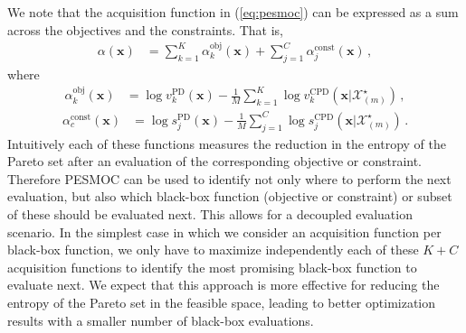 \documentclass[review,preprint,12pt]{elsarticle}
\begin{document}
We note that the acquisition function in (\ref{eq:pesmoc}) can be
expressed as a sum across the objectives and the constraints.
That is,
\begin{align}
\alpha(\mathbf{x}) &= \sum_{k=1}^K \alpha^\text{obj}_k(\mathbf{x}) + \sum_{j=1}^C \alpha^\text{const}_j(\mathbf{x})\,,
\end{align}
where
\begin{align}
\alpha^\text{obj}_k(\mathbf{x}) & 
	= \log v_k^{\text{PD}}(\textbf{x}) - \frac{1}{M}\sum_{k=1}^{K}\log v_k^{\text{CPD}} (\textbf{x}|\mathcal{X}^{\star}_{(m)})\,,
\end{align}
\begin{align}
\alpha^\text{const}_c(\mathbf{x}) &
	= \log s_j^{\text{PD}}(\textbf{x}) - \frac{1}{M}\sum_{j=1}^{C}\log s_j^{\text{CPD}}(\textbf{x}|\mathcal{X}^{\star}_{(m)})\,.
\end{align}
Intuitively each of these functions measures the reduction in the entropy of the Pareto set after an evaluation 
of the corresponding objective or constraint. Therefore PESMOC can be used to identify not only where to perform 
the next evaluation, but also which black-box function (objective or constraint) or subset of these should be evaluated 
next. This allows for a decoupled evaluation scenario. In the simplest case in which we consider an acquisition function
per black-box function, we only have to maximize independently each of these $K+C$ acquisition functions to identify the 
most promising black-box function to evaluate next. We expect that this approach is more effective for 
reducing the entropy of the Pareto set in the feasible space, leading to better optimization results with
a smaller number of black-box evaluations.
\end{document}
